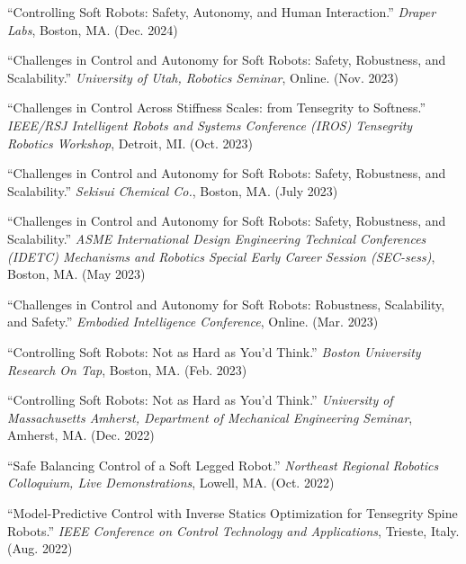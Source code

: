 \documentclass[letterpaper]{deedy-resume} %
\begin{document}
 \begin{etaremune}[itemsep=0.1cm]

\setcounter{enumi}{31}

\item ``Controlling Soft Robots: Safety, Autonomy, and Human Interaction.'' {\it Draper Labs}, Boston, MA. (Dec. 2024)

\item ``Challenges in Control and Autonomy for Soft Robots: Safety, Robustness, and Scalability.'' {\it University of Utah, Robotics Seminar}, Online. (Nov. 2023)

\item ``Challenges in Control Across Stiffness Scales: from Tensegrity to Softness.'' {\it IEEE/RSJ Intelligent Robots and Systems Conference (IROS) Tensegrity Robotics Workshop}, Detroit, MI. (Oct. 2023)

\item ``Challenges in Control and Autonomy for Soft Robots: Safety, Robustness, and Scalability.'' {\it Sekisui Chemical Co.}, Boston, MA. (July 2023)

\item ``Challenges in Control and Autonomy for Soft Robots: Safety, Robustness, and Scalability.'' {\it ASME International Design Engineering Technical Conferences (IDETC) Mechanisms and Robotics Special Early Career Session (SEC-sess)}, Boston, MA. (May 2023)

\item ``Challenges in Control and Autonomy for Soft Robots: Robustness, Scalability, and Safety.'' {\it Embodied Intelligence Conference}, Online. (Mar. 2023)

\item ``Controlling Soft Robots: Not as Hard as You'd Think.'' {\it Boston University Research On Tap}, Boston, MA. (Feb. 2023)

\item ``Controlling Soft Robots: Not as Hard as You'd Think.'' {\it University of Massachusetts Amherst, Department of Mechanical Engineering Seminar}, Amherst, MA. (Dec. 2022)

\item ``Safe Balancing Control of a Soft Legged Robot.'' {\it Northeast Regional Robotics Colloquium, Live Demonstrations}, Lowell, MA. (Oct. 2022)

\item ``Model-Predictive Control with Inverse Statics Optimization for Tensegrity Spine Robots.'' {\it IEEE Conference on Control Technology and Applications}, Trieste, Italy. (Aug. 2022)


\end{etaremune}
\end{document}
